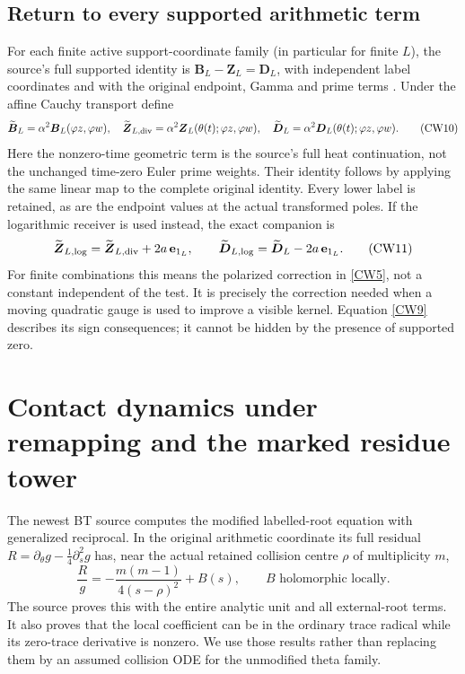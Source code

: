 \documentclass[11pt,a4paper]{article}
\theoremstyle{definition}\newtheorem{definition}[theorem]{Definition}
\begin{document}
\subsection{Return to every supported arithmetic term}
For each finite active support-coordinate family (in particular for finite $L$), the source's full supported identity is
$\boldsymbol B_L-\boldsymbol Z_L=\boldsymbol D_L$, with independent label coordinates and with the original endpoint, Gamma and prime terms \cite{HA,FJ}. Under the affine Cauchy transport define
\begin{equation}
 \widetilde{\boldsymbol B}_L
  =\alpha^2\boldsymbol B_L(\varphi z,\varphi w),\quad
 \widetilde{\boldsymbol Z}_{L,\rm div}
  =\alpha^2\boldsymbol Z_L(\theta(t);\varphi z,\varphi w),\quad
 \widetilde{\boldsymbol D}_L
  =\alpha^2\boldsymbol D_L(\theta(t);\varphi z,\varphi w).
                                                               \tag{CW10}\label{CW10}
\end{equation}
Here the nonzero-time geometric term is the source's full heat continuation, not the unchanged time-zero Euler prime weights. Their identity follows by applying the same linear map to the complete original identity. Every lower label is retained, as are the endpoint values at the actual transformed poles. If the logarithmic receiver is used instead, the exact companion is
\begin{equation}
 \widetilde{\boldsymbol Z}_{L,\log}
   =\widetilde{\boldsymbol Z}_{L,\rm div}+2a\,\mathbf e_{1_L},
 \qquad
 \widetilde{\boldsymbol D}_{L,\log}
   =\widetilde{\boldsymbol D}_L-2a\,\mathbf e_{1_L}.
                                                               \tag{CW11}\label{CW11}
\end{equation}
For finite combinations this means the polarized correction in \eqref{CW5}, not a constant independent of the test. It is precisely the correction needed when a moving quadratic gauge is used to improve a visible kernel. Equation \eqref{CW9} describes its sign consequences; it cannot be hidden by the presence of supported zero.

\section{Contact dynamics under remapping and the marked residue tower}
The newest BT source \cite{BT} computes the modified labelled-root equation with generalized reciprocal. In the original arithmetic coordinate its full residual $R=\partial_\theta g-\tfrac14\partial_s^2g$ has, near the actual retained collision centre $\rho$ of multiplicity $m$,
\begin{equation}
 \frac Rg=-\frac{m(m-1)}{4(s-\rho)^2}+B(s),
 \qquad B\text{ holomorphic locally}.                        \tag{CT1}\label{CT1}
\end{equation}
The source proves this with the entire analytic unit and all external-root terms. It also proves that the local coefficient can be in the ordinary trace radical while its zero-trace derivative is nonzero. We use those results rather than replacing them by an assumed collision ODE for the unmodified theta family.
\end{document}
